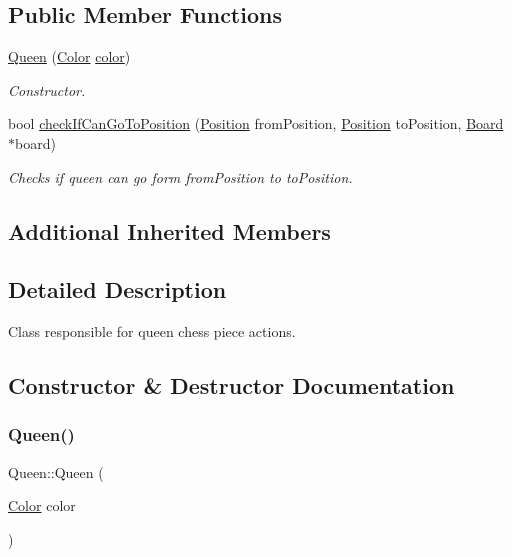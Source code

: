 \subsection*{Public Member Functions}
\begin{DoxyCompactItemize}
\item 
\hyperlink{classQueen_ae4b3b4f515f2024e1f554369332fa834}{Queen} (\hyperlink{Enums_8h_ab87bacfdad76e61b9412d7124be44c1c}{Color} \hyperlink{classChessPiece_a8c8fc170e7c719ac2b71a93a56a38f01}{color})
\begin{DoxyCompactList}\small\item\em Constructor. \end{DoxyCompactList}\item 
bool \hyperlink{classQueen_a504eb0f657c4ae6acbf54ef8ab4c5cf9}{check\+If\+Can\+Go\+To\+Position} (\hyperlink{classPosition}{Position} from\+Position, \hyperlink{classPosition}{Position} to\+Position, \hyperlink{classBoard}{Board} $\ast$board)
\begin{DoxyCompactList}\small\item\em Checks if queen can go form from\+Position to to\+Position. \end{DoxyCompactList}\end{DoxyCompactItemize}
\subsection*{Additional Inherited Members}


\subsection{Detailed Description}
Class responsible for queen chess piece actions. 

\subsection{Constructor \& Destructor Documentation}
\mbox{\label{classQueen_ae4b3b4f515f2024e1f554369332fa834}} 
\subsubsection{\texorpdfstring{Queen()}{Queen()}}
{\footnotesize\ttfamily Queen\+::\+Queen (\begin{DoxyParamCaption}\item[{\hyperlink{Enums_8h_ab87bacfdad76e61b9412d7124be44c1c}{Color}}]{color }\end{DoxyParamCaption})\hspace{0.3cm}{\ttfamily [inline]}}



